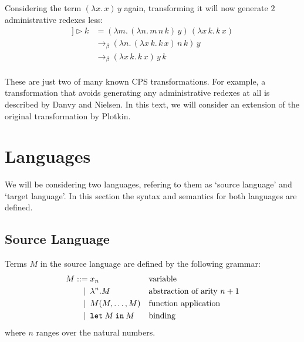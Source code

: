 \documentclass[a4paper,11pt,draft]{article}
\newcommand{\kw}[1]{\mathtt{#1}}
\begin{document}
Considering the term $(\lambda x. \, x) \, y$ again, transforming it will now
generate $2$ administrative redexes less:
\begin{align*}
  [\![(\lambda x. \, x) \, y]\!] \triangleright k &= (\lambda m. \, (\lambda n. \, m \, n \, k) \, y) \, (\lambda x \, k. \, k \, x)\\
                                                  &\rightarrow_{\beta} (\lambda n. \, (\lambda x \, k. \, k \, x) \, n \, k) \, y\\
                                                  &\rightarrow_{\beta} (\lambda x \, k. \, k \, x) \, y \, k
\end{align*}

\paragraph{}

These are just two of many known CPS transformations. For example, a
transformation that avoids generating any administrative redexes at all is
described by Danvy and Nielsen. In this text, we will consider an extension of
the original transformation by Plotkin.


\section{Languages}\label{sec:languages}

We will be considering two languages, refering to them as `source language' and
`target language'. In this section the syntax and semantics for both languages
are defined.

\subsection{Source Language}

Terms $M$ in the source language are defined by the following grammar:
\begin{align*}
M ::=             &\; x_{n}
                  && \text{variable} \\
\llap{\textbar\:} &\; \lambda^{n}.M
                  && \text{abstraction of arity $n+1$} \\
\llap{\textbar\:} &\; M(M, \ldots, M)
                  && \text{function application} \\
\llap{\textbar\:} &\; \kw{let} \: M \: \kw{in} \: M
                  && \text{binding}
\end{align*}
where $n$ ranges over the natural numbers.
\end{document}
